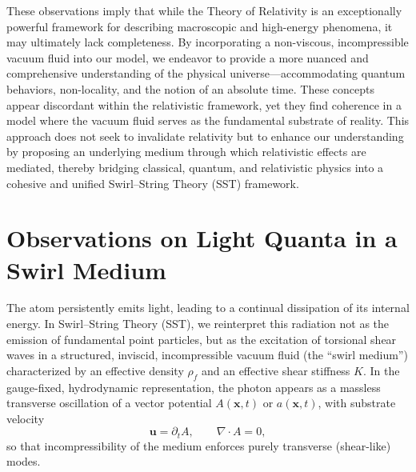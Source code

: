 \documentclass[10pt,reprint,aps,onecolumn,nofootinbib]{revtex4-2}
\newcommand{\rhof}{\rho_{\!f}}                           %
\begin{document}
            These observations imply that while the Theory of Relativity is an exceptionally powerful framework for describing macroscopic and high-energy phenomena, it may ultimately lack completeness. By incorporating a non-viscous, incompressible vacuum fluid into our model, we endeavor to provide a more nuanced and comprehensive understanding of the physical universe---accommodating quantum behaviors, non-locality, and the notion of an absolute time. These concepts appear discordant within the relativistic framework, yet they find coherence in a model where the vacuum fluid serves as the fundamental substrate of reality. This approach does not seek to invalidate relativity but to enhance our understanding by proposing an underlying medium through which relativistic effects are mediated, thereby bridging classical, quantum, and relativistic physics into a cohesive and unified Swirl--String Theory (SST) framework.


    \section{Observations on Light Quanta in a Swirl Medium}

        The atom persistently emits light, leading to a continual dissipation of its internal energy. In Swirl--String Theory (SST), we reinterpret this radiation not as the emission of fundamental point particles, but as the excitation of torsional shear waves in a structured, inviscid, incompressible vacuum fluid (the ``swirl medium'') characterized by an effective density \(\rhof\) and an effective shear stiffness \(K\).\cite{Helmholtz1858,Thomson1867,Maxwell1875,Unruh1981,Volovik2003,Barcelo2011,IskandaraniPhoton2025,IskandaraniHydrogenGS} In the gauge-fixed, hydrodynamic representation, the photon appears as a massless transverse oscillation of a vector potential \(A(\mathbf{x},t)\) or \(a(\mathbf{x},t)\), with substrate velocity
        \begin{equation}
            \mathbf{u} = \partial_t A,
            \qquad
            \nabla\!\cdot A = 0,
        \end{equation}
        so that incompressibility of the medium enforces purely transverse (shear-like) modes.\cite{IskandaraniPhoton2025}
\end{document}
